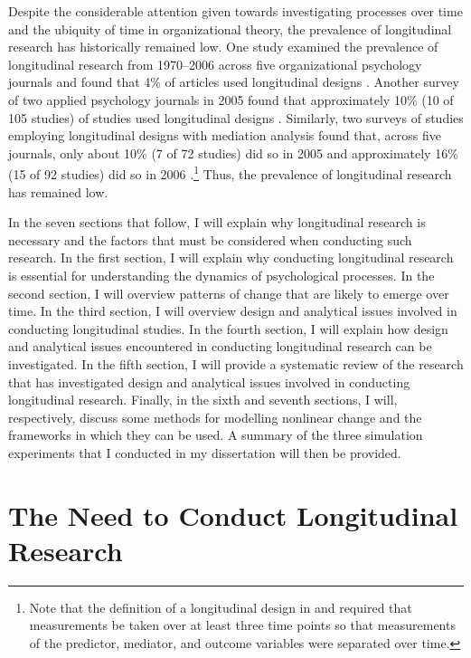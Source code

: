 \documentclass[
12pt, %
twoside,
english]{guelphthesis}
\begin{document}
Despite the considerable attention given towards investigating processes over time and the ubiquity of time in organizational theory, the prevalence of longitudinal research has historically remained low. One study examined the prevalence of longitudinal research from 1970--2006 across five organizational psychology journals and found that 4\% of articles used longitudinal designs \autocite{roe2014b}. Another survey of two applied psychology journals in 2005 found that approximately 10\% (10 of 105 studies) of studies used longitudinal designs \autocite{roe2008}. Similarly, two surveys of studies employing longitudinal designs with mediation analysis found that, across five journals, only about 10\% (7 of 72 studies) did so in 2005 \autocite{maxwell2007} and approximately 16\% (15 of 92 studies) did so in 2006 \autocite{mitchell2013}.\footnote{Note that the definition of a longitudinal design in \textcite{maxwell2007} and \textcite{mitchell2013} required that measurements be taken over at least three time points so that measurements of the predictor, mediator, and outcome variables were separated over time.} Thus, the prevalence of longitudinal research has remained low.

In the seven sections that follow, I will explain why longitudinal research is necessary and the factors that must be considered when conducting such research. In the first section, I will explain why conducting longitudinal research is essential for understanding the dynamics of psychological processes. In the second section, I will overview patterns of change that are likely to emerge over time. In the third section, I will overview design and analytical issues involved in conducting longitudinal studies. In the fourth section, I will explain how design and analytical issues encountered in conducting longitudinal research can be investigated. In the fifth section, I will provide a systematic review of the research that has investigated design and analytical issues involved in conducting longitudinal research. Finally, in the sixth and seventh sections, I will, respectively, discuss some methods for modelling nonlinear change and the frameworks in which they can be used. A summary of the three simulation experiments that I conducted in my dissertation will then be provided.

\hypertarget{the-need-to-conduct-longitudinal-research}{%
\section{The Need to Conduct Longitudinal Research}\label{the-need-to-conduct-longitudinal-research}}
\end{document}
